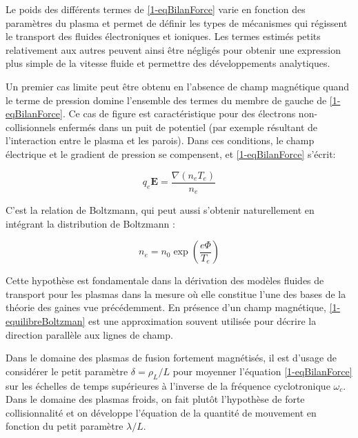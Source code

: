 \begin{refsection}
Le poids des différents termes de \eqref{1-eqBilanForce} varie en fonction des
paramètres du plasma et permet de définir les types de mécanismes qui régissent
le transport des fluides électroniques et ioniques. Les termes estimés petits
relativement aux autres peuvent ainsi être négligés pour obtenir une
expression plus simple de la vitesse fluide et permettre des développements
analytiques.

Un premier cas limite peut être obtenu en l'absence de champ magnétique quand
le terme de pression domine l'ensemble des termes du membre de gauche de
\eqref{1-eqBilanForce}. Ce cas de figure est caractéristique pour des électrons
non-collisionnels enfermés dans un puit de potentiel (par exemple résultant de
l'interaction entre le plasma et les parois). Dans ces conditions, le champ électrique et le gradient
de pression se compensent, et \eqref{1-eqBilanForce} s'écrit:

\begin{equation}
\label{1-equilibreBoltzman}
q_e\mathbf
E =\frac{\nabla (n_e T_e)}{n_e}
\end{equation}

C'est la relation de Boltzmann, qui peut aussi s'obtenir naturellement en
intégrant la distribution de Boltzmann :

\begin{equation}
\label{1-profilBoltzman}
n_e=n_0\exp\left(\frac{e\Phi}{T_e}\right)
\end{equation}

Cette hypothèse est fondamentale dans la dérivation des modèles fluides
de transport pour les plasmas dans la mesure où elle constitue l'une des bases
de la théorie des gaines vue précédemment.
En présence d'un champ magnétique,
\eqref{1-equilibreBoltzman} est une approximation souvent utilisée pour
décrire la direction parallèle aux lignes de champ. 

Dans le domaine des plasmas de fusion fortement magnétisés, il est
d'usage de considérer le petit paramètre $\delta=\rho_L/L$ pour moyenner
l'équation \eqref{1-eqBilanForce} sur les échelles de temps supérieures à
l'inverse de la fréquence cyclotronique $\omega_{c}$.
Dans le domaine des plasmas
froids, on fait plutôt l'hypothèse de forte collisionnalité et on développe
l'équation de la quantité de mouvement en fonction du petit paramètre
$\lambda/L$.


\end{refsection}
